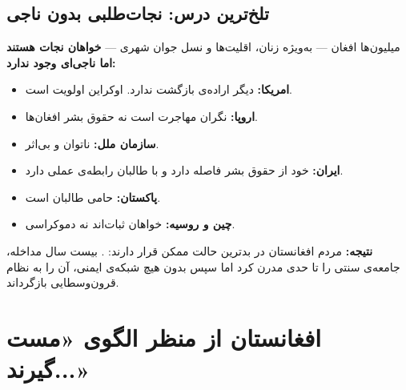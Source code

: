 \subsection{تلخ‌ترین درس: نجات‌طلبی بدون ناجی}

\begin{tcolorbox}[enemybox, title={وضعیت کنونی: نجات‌طلبی بدون ناجی}]
میلیون‌ها افغان — به‌ویژه زنان، اقلیت‌ها و نسل جوان شهری — \textbf{خواهان نجات هستند اما ناجی‌ای وجود ندارد:}

\begin{itemize}[nosep, rightmargin=1em]
  \item \textbf{امریکا:} دیگر اراده‌ی بازگشت ندارد. اوکراین اولویت است.
  \item \textbf{اروپا:} نگران مهاجرت است نه حقوق بشر افغان‌ها.
  \item \textbf{سازمان ملل:} ناتوان و بی‌اثر.
  \item \textbf{ایران:} خود از حقوق بشر فاصله دارد و با طالبان رابطه‌ی عملی دارد.
  \item \textbf{پاکستان:} حامی طالبان است.
  \item \textbf{چین و روسیه:} خواهان ثبات‌اند نه دموکراسی.
\end{itemize}

\textbf{نتیجه:} مردم افغانستان در بدترین حالت ممکن قرار دارند: . بیست سال مداخله، جامعه‌ی سنتی را تا حدی مدرن کرد اما سپس بدون هیچ شبکه‌ی ایمنی، آن را به نظام قرون‌وسطایی بازگرداند.
\end{tcolorbox}

\section{افغانستان از منظر الگوی «مست گیرند...»}
\label{sec:app-afg-paradigm}

